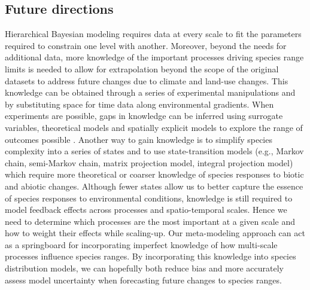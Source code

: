 \subsection*{Future directions}
Hierarchical Bayesian modeling requires data at every scale to fit the parameters required to constrain one level with another.
Moreover, beyond the needs for additional data, more knowledge of the important processes driving species range limits is needed to allow for extrapolation beyond the scope of the original datasets to address future changes due to climate and land-use changes.
This knowledge can be obtained through a series of experimental manipulations and by substituting space for time data along environmental gradients.
When experiments are possible, gaps in knowledge can be inferred using surrogate variables, theoretical models and spatially explicit models to explore the range of outcomes possible \citep{Fortin2012}. 
Another way to gain knowledge is to simplify species complexity into a series of states and to use state-transition models (e.g., Markov chain, semi-Markov chain, matrix projection model, integral projection model) which require more theoretical or coarser knowledge of species responses to biotic and abiotic changes.
Although fewer states allow us to better capture the essence of species responses to environmental conditions, knowledge is still required to model feedback effects across processes and spatio-temporal scales.
Hence we need to determine which processes are the most important at a given scale and how to weight their effects while scaling-up.
Our meta-modeling approach can act as a springboard for incorporating imperfect knowledge of how multi-scale processes influence species ranges.
By incorporating this knowledge into species distribution models, we can hopefully both reduce bias and more accurately assess model uncertainty when forecasting future changes to species ranges.
